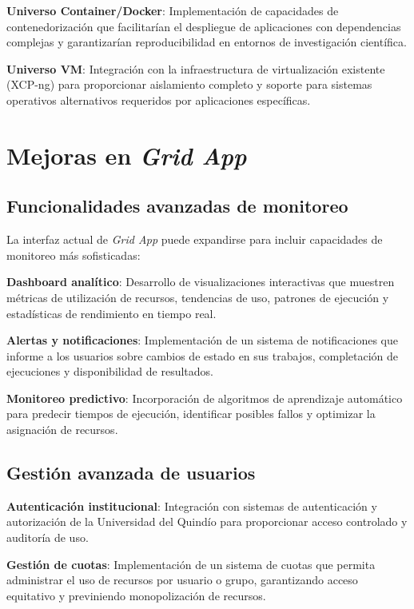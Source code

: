 \textbf{Universo Container/Docker}: Implementación de capacidades de contenedorización que facilitarían el despliegue de aplicaciones con dependencias complejas y garantizarían reproducibilidad en entornos de investigación científica.

\textbf{Universo VM}: Integración con la infraestructura de virtualización existente (XCP-ng) para proporcionar aislamiento completo y soporte para sistemas operativos alternativos requeridos por aplicaciones específicas.

\section{Mejoras en \textit{Grid App}}
\noindent

\subsection{Funcionalidades avanzadas de monitoreo}
\noindent

La interfaz actual de \textit{Grid App} puede expandirse para incluir capacidades de monitoreo más sofisticadas:

\textbf{Dashboard analítico}: Desarrollo de visualizaciones interactivas que muestren métricas de utilización de recursos, tendencias de uso, patrones de ejecución y estadísticas de rendimiento en tiempo real.

\textbf{Alertas y notificaciones}: Implementación de un sistema de notificaciones que informe a los usuarios sobre cambios de estado en sus trabajos, completación de ejecuciones y disponibilidad de resultados.

\textbf{Monitoreo predictivo}: Incorporación de algoritmos de aprendizaje automático para predecir tiempos de ejecución, identificar posibles fallos y optimizar la asignación de recursos.

\subsection{Gestión avanzada de usuarios}
\noindent

\textbf{Autenticación institucional}: Integración con sistemas de autenticación y autorización de la Universidad del Quindío para proporcionar acceso controlado y auditoría de uso.

\textbf{Gestión de cuotas}: Implementación de un sistema de cuotas que permita administrar el uso de recursos por usuario o grupo, garantizando acceso equitativo y previniendo monopolización de recursos.

